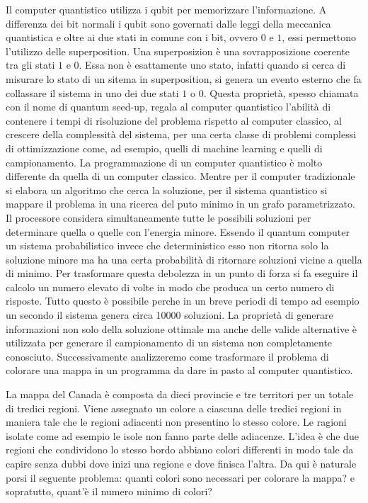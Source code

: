 Il computer quantistico utilizza i qubit per memorizzare l'informazione. A differenza dei bit normali i qubit sono governati dalle leggi della meccanica quantistica e oltre ai due stati in comune con i bit, ovvero $0$ e $1$, essi permettono l'utilizzo delle superposition. Una superposizion è una sovrapposizione coerente tra gli stati $1$ e $0$. Essa non è esattamente uno stato, infatti quando si cerca di misurare lo stato di un sitema in superposition, si genera un evento esterno che fa collassare il sistema in uno dei due stati $1$ o $0$. Questa proprietà, spesso chiamata con il nome di quantum seed-up, regala al computer quantistico l'abilità di contenere i tempi di risoluzione del problema rispetto al computer classico, al crescere della complessità del sistema, per una certa classe di problemi complessi di ottimizzazione come, ad esempio, quelli di machine learning e quelli di campionamento. La programmazione di un computer quantistico è molto differente da quella di un computer classico. Mentre per il computer tradizionale si elabora un algoritmo che cerca la soluzione, per il sistema quantistico si mappare il problema in una ricerca del puto minimo in un grafo parametrizzato. Il processore considera simultaneamente tutte le possibili soluzioni per determinare quella o quelle con l'energia minore. Essendo il quantum computer un sistema probabilistico invece che deterministico esso non ritorna solo la soluzione minore ma ha una certa probabilità di ritornare soluzioni vicine a quella di minimo. Per trasformare questa debolezza in un punto di forza si fa eseguire il calcolo un numero elevato di volte in modo che produca un certo numero di risposte. Tutto questo è possibile perche in un breve periodi di tempo ad esempio un secondo il sistema genera circa 10000 soluzioni. La proprietà di generare informazioni non solo della soluzione ottimale ma anche delle valide alternative è utilizzata per generare il campionamento di un sistema non completamente conosciuto. Successivamente analizzeremo come trasformare il problema di colorare una mappa in un programma da dare in pasto al computer quantistico.

La mappa del Canada è composta da dieci provincie e tre territori per un totale di tredici regioni. Viene assegnato un colore a ciascuna delle tredici regioni in maniera tale che le regioni adiacenti non presentino lo stesso colore. Le ragioni isolate come ad esempio le isole non fanno parte delle adiacenze. L'idea è che due regioni che condividono lo stesso bordo abbiano colori differenti in modo tale da capire senza dubbi dove inizi una regione e dove finisca l'altra. Da qui è naturale porsi il seguente problema: quanti colori sono necessari per colorare la mappa? e sopratutto, quant'è il numero minimo di colori?

